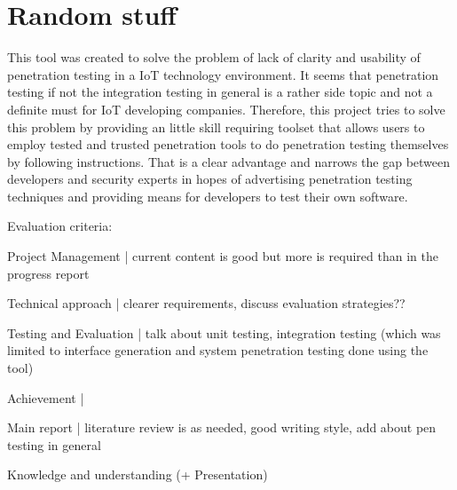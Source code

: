 \section{Random stuff}

This tool was created to solve the problem of lack of clarity and usability of penetration testing in a IoT technology environment. It seems that penetration testing if not the integration testing in general is a rather side topic and not a definite must for IoT developing companies. Therefore, this project tries to solve this problem by providing an little skill requiring toolset that allows users to employ tested and trusted penetration tools to do penetration testing themselves by following instructions. That is a clear advantage and narrows the gap between developers and security experts in hopes of advertising penetration testing techniques and providing means for developers to test their own software.


Evaluation criteria:
\begin{list}{-}
	\item Project Management | current content is good but more is required than in the progress report
	\item Technical approach | clearer requirements, discuss evaluation strategies??
	\item Testing and Evaluation | talk about unit testing, integration testing (which was limited to interface generation and system penetration testing done using the tool) 
	\item Achievement | 
	\item Main report | literature review is as needed, good writing style, add about pen testing in general
	\item Knowledge and understanding (+ Presentation)
\end{list}
	